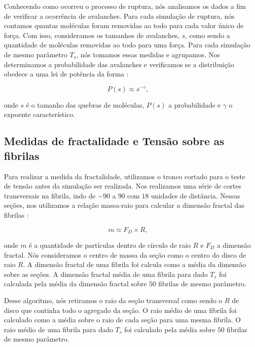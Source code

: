 \documentclass[11pt,a4paper]{article} %
\begin{document}
    Conhecendo como ocorreu o processo de ruptura, nós analisamos os dados a fim de verificar a ocorrência de avalanches. Para cada simulação de ruptura, 
    nós contamos quantas moléculas foram removidas ao todo para cada valor único de força. Com isso, consideramos os tamanhos de avalanches, \(s\),  
    como sendo a quantidade de moléculas removidas ao todo para uma força. Para cada simulação de mesmo parâmetro \(T_{s}\), nós tomamos essas medidas  
    e agrupamos. Nos determinamos a probabilidade das avalanches e verificamos se a distribuição obedece a uma lei de potência da forma  \cite{Zapperi1997}: 


    \begin{equation} 
        P(s) \approx s^{-\gamma}, 
    \end{equation} 


    \noindent onde \(s\) é o tamanho das quebras de moléculas, \(P(s)\) a probabilidade e \(\gamma\) o expoente característico. 

    \subsection{Medidas de fractalidade e Tensão sobre as fibrilas} 

    Para realizar a medida da fractalidade, utilizamos o tronco cortado para o teste de tensão antes da simulação ser realizada. Nos  
    realizamos uma série de cortes transversais na fibrila, indo de \(-90\) a \(90\) com \(18\) unidades de distância. Nessas seções,  
    nos utilizamos a relação massa-raio para calcular a dimensão fractal das fibrilas \cite{giordano2012computational}: 


    \begin{equation} 
        m \approx F_{D} \times R, 
    \end{equation} 


    \noindent onde \(m\) é a quantidade de partículas dentro de círculo de raio \(R\) e \(F_{D}\) a dimensão fractal. 
    Nós consideramos o centro de massa da seção como o centro do disco de raio \(R\). A dimensão fractal de uma fibrila 
    foi calcula como a média da dimensão sobre as seções. A dimensão fractal média de uma fibrila para dado \(T_{s}\) foi  
    calculada pela média da dimensão fractal sobre \(50\) fibrilas de mesmo parâmetro. 

    Desse algoritmo, nós retiramos o raio da seção transversal como sendo o \(R\) de disco que continha todo o agregado  
    da seção. O raio médio de uma fibrila foi calculado como a média sobre o raio de cada seção para uma mesma fibrila. 
    O raio médio de uma fibrila para dado \(T_{s}\) foi calculado pela média sobre \(50\) fibrilas de mesmo parâmetro. 
\end{document}
